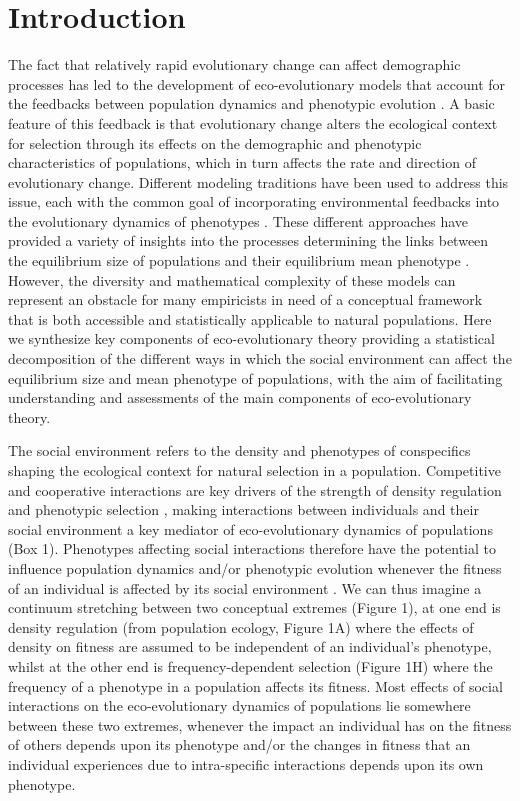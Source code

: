 \documentclass{article}
\begin{document}
\newpage
\section{Introduction}
 The fact that relatively rapid evolutionary change can affect demographic processes has led to the development of eco-evolutionary models that account for the feedbacks between population dynamics and phenotypic evolution \cite[reviewed by][]{Pelletier2009, Hendry2018, Govaert2019}. A basic feature of this feedback is that evolutionary change alters the ecological context for selection through its effects on the demographic and phenotypic characteristics of populations, which in turn affects the rate and direction of evolutionary change. Different modeling traditions have been used to address this issue, each with the common goal of incorporating environmental feedbacks into the evolutionary dynamics of phenotypes \citep{Heino1998, Lion2018}. These different approaches have provided a variety of insights into the processes determining the links between the equilibrium size of populations and their equilibrium mean phenotype \citep{MacArthur1962, Boyce1984, Charlesworth1994, Abrams1993, Mylius1995, Lande2009a, Engen2020}. However, the diversity and mathematical complexity of these models can represent an obstacle for many empiricists in need of a conceptual framework that is both accessible and statistically applicable to natural populations. Here we synthesize key components of eco-evolutionary theory providing a statistical decomposition of the different ways in which the social environment can affect the equilibrium size and mean phenotype of populations, with the aim of facilitating understanding and assessments of the main components of eco-evolutionary theory. 
 
 The social environment refers to the density and phenotypes of conspecifics shaping the ecological context for natural selection in a population. Competitive and cooperative interactions are key drivers of the strength of density regulation and phenotypic selection \citep{Lack1954, Haldane1956, West-Eberhard1979, frank1998foundations}, making interactions between individuals and their social environment a key mediator of eco-evolutionary dynamics of populations (Box 1). Phenotypes affecting social interactions therefore have the potential to influence population dynamics and/or phenotypic evolution whenever the fitness of an individual is affected by its social environment \citep{Wolf1999SocialSelection, Travis2013}. We can thus imagine a continuum stretching between two conceptual extremes (Figure 1), at one end is density regulation (from population ecology, Figure 1A) where the effects of density on fitness are assumed to be independent of an individual's phenotype, whilst at the other end is frequency-dependent selection (Figure 1H) where the frequency of a phenotype in a population affects its fitness. Most effects of social interactions on the eco-evolutionary dynamics of populations lie somewhere between these two extremes, whenever the impact an individual has on the fitness of others depends upon its phenotype and/or the changes in fitness that an individual experiences due to intra-specific interactions depends upon its own phenotype. 
 
\end{document}
